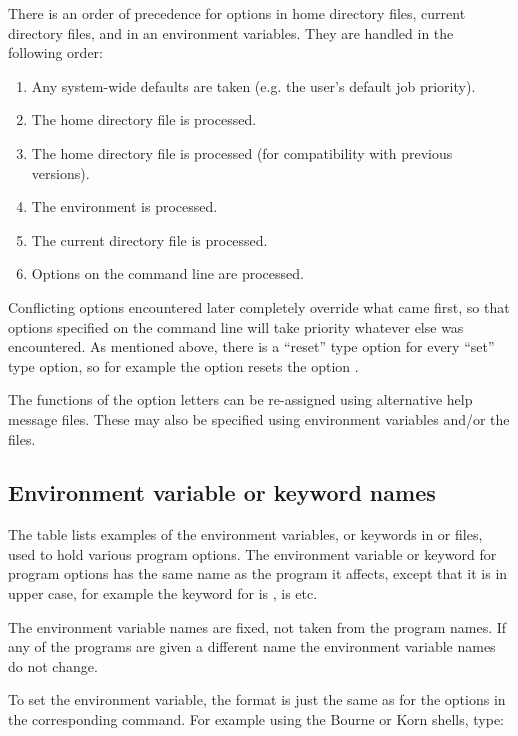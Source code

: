 There is an order of precedence for options in home directory \homeconfigpath{} files, current directory \configurationfile{} files,
and in an environment variables. They are handled in the following order:

\begin{enumerate}
\item Any system-wide defaults are taken (e.g. the user's default job priority).
\item The home directory \homeconfigpath{} file is processed.
\item The home directory \configurationfile file{} is processed (for compatibility with previous versions).
\item The environment is processed.
\item The current directory \configurationfile{} file is processed.
\item Options on the command line are processed.
\end{enumerate}
Conflicting options encountered later completely override what came first, so that options specified on the command line will take priority
whatever else was encountered. As mentioned above, there is a ``reset'' type option for every ``set'' type option, so for example the
\PrBtr{} option  resets the option .

The functions of the option letters can be re-assigned using alternative help message files. These may also be specified using environment
variables and/or the \configurationfile{} files.

\subsection{Environment variable or keyword names}
The table lists examples of the environment variables, or keywords in \configurationfile{} or \homeconfigpath{} files, used to hold various program
options. The environment variable or keyword for program options has the same name as the program it affects, except that it is in upper
case, for example the keyword for \PrBtq{} is \filename{\BtqVarname}, \PrBtr{} is \filename{\BtrVarname} etc.

The environment variable names are fixed, not taken from the program names. If any of the programs are given a different name the
environment variable names do not change.

To set the environment variable, the format is just the same as for the options in the corresponding command. For example using the Bourne or
Korn shells, type:

